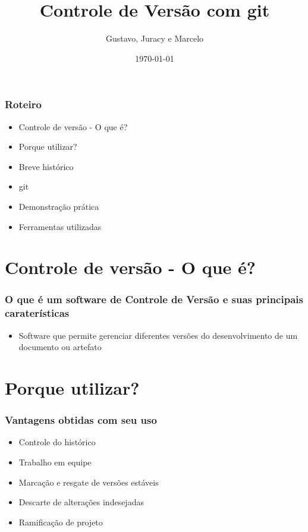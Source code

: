 \documentclass{beamer}
\title[Gerência de Configuração e Testes]{Controle de Versão com git}
\author[Grupo Masters]{Gustavo, Juracy e Marcelo}
\institute{Centro Universitário Jorge Amado}
\date{\today}
\begin{document}
  \frame{\titlepage}
    \begin{frame}
    \frametitle{Roteiro}
   	\begin{itemize}
      \item Controle de versão - O que é?
      \item Porque utilizar?
      \item Breve histórico
      \item git
      \item Demonstração prática
      \item Ferramentas utilizadas
    \end{itemize}
  \end{frame}

  \section{Controle de versão - O que é?}
  \begin{frame}
    \frametitle{O que é um software de Controle de Versão e suas principais caraterísticas}
    \begin{itemize}
      \item Software que permite gerenciar diferentes versões do desenvolvimento de um documento ou artefato
    \end{itemize}
    \vfill
  \end{frame}

  \section{Porque utilizar?}
  \begin{frame}
    \frametitle{Vantagens obtidas com seu uso}
    \begin{itemize}
      \item Controle do histórico
      \item Trabalho em equipe
      \item Marcação e resgate de versões estáveis
      \item Descarte de alterações indesejadas
      \item Ramificação de projeto
    \end{itemize}
    \vfill
  \end{frame}
\end{document}
